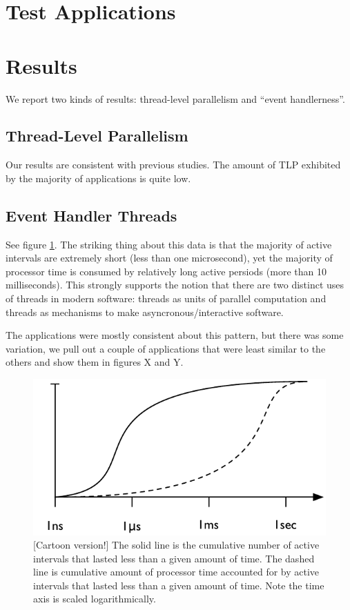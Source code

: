 \documentclass[11pt]{sigplanconf}
\begin{document}
\section{Test Applications}

\section{Results}

We report two kinds of results: thread-level parallelism and ``event
handlerness''.

\subsection{Thread-Level Parallelism}

Our results are consistent with previous studies.  The amount of TLP
exhibited by the majority of applications is quite low.

\subsection{Event Handler Threads}

See figure \ref{figure:event_handler_data}.  The striking thing about
this data is that the majority of active intervals are extremely short
(less than one microsecond), yet the majority of processor time is
consumed by relatively long active persiods (more than 10 milliseconds).
This strongly supports the notion that there are two distinct uses of
threads in modern software: threads as units of parallel computation and
threads as mechanisms to make asyncronous/interactive software.

The applications were mostly consistent about this pattern, but there
was some variation, we pull out a couple of applications that were least
similar to the others and show them in figures X and Y.

\begin{figure}
\includegraphics[width=\columnwidth]{cartoon_event_handler_data}
\caption{[Cartoon version!] The solid line is the cumulative number of
  active intervals that lasted less than a given amount of time.  The
  dashed line is cumulative amount of processor time accounted for by
  active intervals that lasted less than a given amount of time.  Note the
  time axis is scaled logarithmically.}
\label{figure:event_handler_data}
\end{figure}
\end{document}
